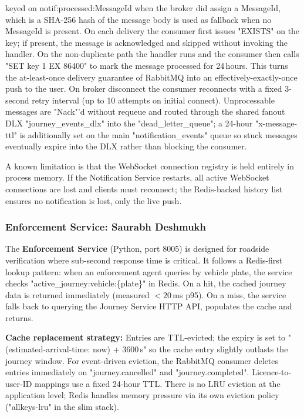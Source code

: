 \documentclass[11pt,a4paper]{article}
\begin{document}
keyed on notif:processed:{MessageId} when the broker did assign a MessageId, which is a SHA-256 hash of the message body is used as fallback when no MessageId is present. On each delivery the consumer first issues "EXISTS" on the key; if present, the message is acknowledged and skipped without invoking the handler. On the non-duplicate path the handler runs and the consumer then calls "SET key 1 EX 86400" to mark the message processed for 24\,hours. This turns the at-least-once delivery guarantee of RabbitMQ into an effectively-exactly-once push to the user. On broker disconnect the consumer reconnects with a fixed 3-second retry interval (up to 10 attempts on initial connect). Unprocessable messages are "Nack"'d without requeue and routed through the shared fanout DLX "journey\_events\_dlx" into the "dead\_letter\_queue"; a 24-hour "x-message-ttl" is additionally set on the main "notification\_events" queue so stuck messages eventually expire into the DLX rather than blocking the consumer.

A known limitation is that the WebSocket connection registry is held entirely in process memory. If the Notification Service restarts, all active WebSocket connections are lost and clients must reconnect; the Redis-backed history list ensures no notification is lost, only the live push.
 
\subsubsection{Enforcement Service: Saurabh Deshmukh}
 
The \textbf{Enforcement Service} (Python, port 8005) is designed for roadside verification where sub-second response time is critical. It follows a Redis-first lookup pattern: when an enforcement agent queries by vehicle plate, the service checks "active\_journey:vehicle:\{plate\}" in Redis. On a hit, the cached journey data is returned immediately (measured $<20$\,ms p95). On a miss, the service falls back to querying the Journey Service HTTP API, populates the cache and returns.

\textbf{Cache replacement strategy:} Entries are TTL-evicted; the expiry is set to "(estimated-arrival-time: now) + 3600\,s" so the cache entry slightly outlasts the journey window. For event-driven eviction, the RabbitMQ consumer deletes entries immediately on "journey.cancelled" and "journey.completed". Licence-to-user-ID mappings use a fixed 24-hour TTL. There is no LRU eviction at the application level; Redis handles memory pressure via its own eviction policy ("allkeys-lru" in the slim stack).
\end{document}

